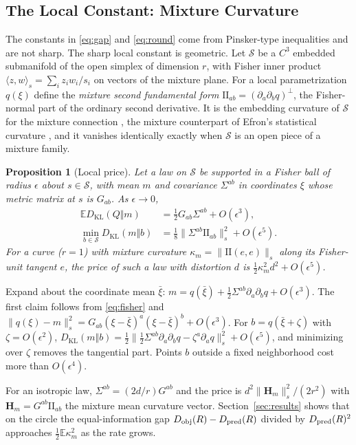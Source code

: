 \documentclass[10pt,journal]{IEEEtran}
\newtheorem{proposition}{Proposition}
\newcommand{\E}{\mathbb E}
\newcommand{\Sset}{\mathcal S}
\newcommand{\KL}{D_{\mathrm{KL}}}
\begin{document}
\subsection{The Local Constant: Mixture Curvature}
The constants in \eqref{eq:gap} and \eqref{eq:round} come from Pinsker-type inequalities and are not sharp. The sharp local constant is geometric. Let $\Sset$ be a $C^3$ embedded submanifold of the open simplex of dimension $r$, with Fisher inner product $\langle z,w\rangle_s=\sum_iz_iw_i/s_i$ on vectors of the mixture plane. For a local parametrization $q(\xi)$ define the \emph{mixture second fundamental form} $\mathrm{I\!I}_{ab}=(\partial_a\partial_bq)^{\perp}$, the Fisher-normal part of the ordinary second derivative. It is the embedding curvature of $\Sset$ for the mixture connection \cite{amari2000methods}, the mixture counterpart of Efron's statistical curvature \cite{efron1975defining}, and it vanishes identically exactly when $\Sset$ is an open piece of a mixture family.
\begin{proposition}[Local price]\label{prop:local}
Let a law on $\Sset$ be supported in a Fisher ball of radius $\epsilon$ about $s\in\Sset$, with mean $m$ and covariance $\Sigma^{ab}$ in coordinates $\xi$ whose metric matrix at $s$ is $G_{ab}$. As $\epsilon\to0$,
\begin{align}
 \E\KL(Q\Vert m)&=\tfrac12G_{ab}\Sigma^{ab}+O(\epsilon^3),\\
 \min_{b\in\Sset}\KL(m\Vert b)&=\tfrac18\big\|\Sigma^{ab}\mathrm{I\!I}_{ab}\big\|_s^2+O(\epsilon^5).
\end{align}
For a curve ($r=1$) with mixture curvature $\kappa_m=\|\mathrm{I\!I}(e,e)\|_s$ along its Fisher-unit tangent $e$, the price of such a law with distortion $d$ is $\tfrac12\kappa_m^2d^2+O(\epsilon^5)$.
\end{proposition}
\begin{IEEEproof}
Expand about the coordinate mean $\bar\xi$: $m=q(\bar\xi)+\frac12\Sigma^{ab}\partial_a\partial_bq+O(\epsilon^3)$. The first claim follows from \eqref{eq:fisher} and $\|q(\xi)-m\|_s^2=G_{ab}(\xi-\bar\xi)^a(\xi-\bar\xi)^b+O(\epsilon^3)$. For $b=q(\bar\xi+\zeta)$ with $\zeta=O(\epsilon^2)$, $\KL(m\Vert b)=\frac12\|\frac12\Sigma^{ab}\partial_a\partial_bq-\zeta^a\partial_aq\|_s^2+O(\epsilon^5)$, and minimizing over $\zeta$ removes the tangential part. Points $b$ outside a fixed neighborhood cost more than $O(\epsilon^4)$.
\end{IEEEproof}
For an isotropic law, $\Sigma^{ab}=(2d/r)G^{ab}$ and the price is $d^2\|\mathbf H_m\|_s^2/(2r^2)$ with $\mathbf H_m=G^{ab}\mathrm{I\!I}_{ab}$ the mixture mean curvature vector. Section~\ref{sec:results} shows that on the circle the equal-information gap $D_{\rm obj}(R)-D_{\rm pred}(R)$ divided by $D_{\rm pred}(R)^2$ approaches $\frac12\E\kappa_m^2$ as the rate grows.
\end{document}
